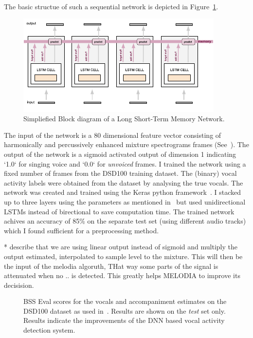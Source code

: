 The basic structue of such a sequential network is depicted in Figure~\ref{fig:lstm_2}.
\begin{figure}
  \includegraphics{Chapters/05_Separation_Known/figures/lstm_2.pdf}
  \caption{Simpliefied Block diagram of a Long Short-Term Memory Network.}
  \label{fig:lstm_2}
\end{figure}
The input of the network is a 80 dimensional feature vector consisting of harmonically and percussively enhanced mixture spectrograms frames (See~\cite{ono08}).
The output of the network is a sigmoid activated output of dimension 1 indicating `1.0` for singing voice and `0.0` for \emph{unvoiced} frames.
I trained the network using a fixed number of frames from the DSD100 training dataset.
The (binary) vocal activity labels were obtained from the dataset by analysing the true vocals.
The network was created and trained using the Keras python framework~\cite{chollet17}.
I stacked up to three layers using the parameters as mentioned in~\cite{Leglaive15} but used unidirectional LSTMs instead of birectional to save computation time.
The trained network achives an accuracy of 85\% on the separate test set (using different audio tracks) which I found sufficient for a preprocessing method.\par
* describe that we are using linear output instead of sigmoid and multiply the output estimated, interpolated to sample level to the mixture. This will then be the input of the melodia algoruth,
THat way some parts of the signal is attenuated when no .. is detected. This greatly helps MELODIA to improve its decisision.

\begin{figure}
  
  \caption{BSS Eval scores for the vocals and accompaniment estimates on the DSD100 dataset as used in~\cite{liutkus17}. Results are shown on the \emph{test} set only. Results indicate the improvements of the DNN based vocal activity detection system.}
  \label{fig:05_comparison_sto_stodnn}
\end{figure}

